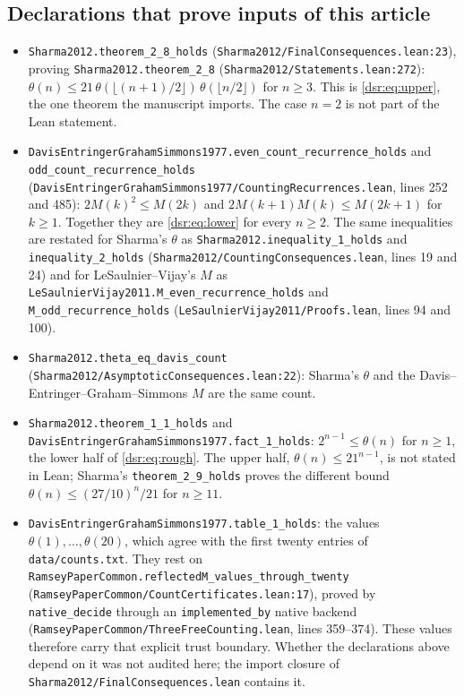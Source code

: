 \documentclass[11pt,a4paper]{article}
\numberwithin{equation}{section}
\theoremstyle{definition}
\theoremstyle{remark}
\newcommand{\lean}[1]{\nolinkurl{#1}}
\theoremstyle{definition}
\theoremstyle{plain}
\begin{document}
\subsection{Declarations that prove inputs of this article}
\begin{itemize}[leftmargin=*,itemsep=3pt]\raggedright
\item \lean{Sharma2012.theorem_2_8_holds}
 (\lean{Sharma2012/FinalConsequences.lean:23}), proving
 \lean{Sharma2012.theorem_2_8} (\lean{Sharma2012/Statements.lean:272}):
 $\theta(n)\le21\,\theta(\lfloor(n+1)/2\rfloor)\,\theta(\lfloor n/2\rfloor)$
 for $n\ge3$. This is \eqref{dsr:eq:upper}, the one theorem the manuscript
 imports. The case $n=2$ is not part of the Lean statement.
\item \lean{DavisEntringerGrahamSimmons1977.even_count_recurrence_holds} and
 \lean{odd_count_recurrence_holds}
 (\lean{DavisEntringerGrahamSimmons1977/CountingRecurrences.lean}, lines 252 and 485):
 $2M(k)^2\le M(2k)$ and $2M(k+1)M(k)\le M(2k+1)$ for $k\ge1$. Together they
 are \eqref{dsr:eq:lower} for every $n\ge2$. The same inequalities are
 restated for Sharma's $\theta$ as \lean{Sharma2012.inequality_1_holds} and
 \lean{inequality_2_holds} (\lean{Sharma2012/CountingConsequences.lean},
 lines 19 and 24) and for LeSaulnier--Vijay's $M$ as
 \lean{LeSaulnierVijay2011.M_even_recurrence_holds} and
 \lean{M_odd_recurrence_holds} (\lean{LeSaulnierVijay2011/Proofs.lean},
 lines 94 and 100).
\item \lean{Sharma2012.theta_eq_davis_count}
 (\lean{Sharma2012/AsymptoticConsequences.lean:22}): Sharma's $\theta$ and the
 Davis--Entringer--Graham--Simmons $M$ are the same count.
\item \lean{Sharma2012.theorem_1_1_holds} and
 \lean{DavisEntringerGrahamSimmons1977.fact_1_holds}:
 $2^{n-1}\le\theta(n)$ for $n\ge1$, the lower half of \eqref{dsr:eq:rough}.
 The upper half, $\theta(n)\le21^{n-1}$, is not stated in Lean; Sharma's
 \lean{theorem_2_9_holds} proves the different bound
 $\theta(n)\le(27/10)^n/21$ for $n\ge11$.
\item \lean{DavisEntringerGrahamSimmons1977.table_1_holds}: the values
 $\theta(1),\ldots,\theta(20)$, which agree with the first twenty entries of
 \lean{data/counts.txt}. They rest on
 \lean{RamseyPaperCommon.reflectedM_values_through_twenty}
 (\lean{RamseyPaperCommon/CountCertificates.lean:17}), proved by
 \lean{native_decide} through an \lean{implemented_by} native backend
 (\lean{RamseyPaperCommon/ThreeFreeCounting.lean}, lines 359--374). These values
 therefore carry that explicit trust boundary. Whether the declarations above
 depend on it was not audited here; the import closure of
 \lean{Sharma2012/FinalConsequences.lean} contains it.
\end{itemize}
\end{document}
